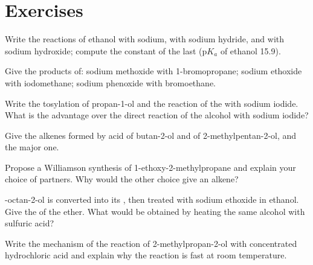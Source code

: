 \section{Exercises}

\begin{exercise}[$\star$]\label{exo:b1:alcohol-activation:1}
Write the reactions of ethanol with sodium, with sodium hydride, and with
sodium hydroxide; compute the constant of the last ($\mathrm{p}K_a$ of
ethanol 15.9).
\end{exercise}

\begin{exercise}[$\star$]\label{exo:b1:alcohol-activation:2}
Give the products of: sodium methoxide with 1-bromopropane; sodium
ethoxide with iodomethane; sodium phenoxide with bromoethane.
\end{exercise}

\begin{exercise}[$\star$]\label{exo:b1:alcohol-activation:3}
Write the tosylation of propan-1-ol and the reaction of the  with
sodium iodide. What is the advantage over the direct reaction of the
alcohol with sodium iodide?
\end{exercise}

\begin{exercise}[$\star$]\label{exo:b1:alcohol-activation:4}
Give the alkenes formed by acid  of butan-2-ol and of
2-methylpentan-2-ol, and the major one.
\end{exercise}

\begin{exercise}[$\star\star$]\label{exo:b1:alcohol-activation:5}
Propose a Williamson synthesis of 1-ethoxy-2-methylpropane and explain
your choice of partners. Why would the other choice give an alkene?
\end{exercise}

\begin{exercise}[$\star\star$]\label{exo:b1:alcohol-activation:6}
-octan-2-ol is converted into its , then treated with
sodium ethoxide in ethanol. Give the  of the ether. What
would be obtained by heating the same alcohol with sulfuric acid?
\end{exercise}

\begin{exercise}[$\star\star$]\label{exo:b1:alcohol-activation:7}
Write the mechanism of the reaction of 2-methylpropan-2-ol with
concentrated hydrochloric acid and explain why the reaction is fast at
room temperature.
\end{exercise}

